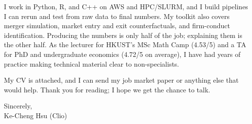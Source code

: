 \documentclass[11pt,letterpaper]{article}
\begin{document}
I work in Python, R, and C++ on AWS and HPC/SLURM, and I build pipelines I can rerun and test from raw data to final numbers. My toolkit also covers merger simulation, market entry and exit counterfactuals, and firm-conduct identification. Producing the numbers is only half of the job; explaining them is the other half. As the lecturer for HKUST's MSc Math Camp (4.53/5) and a TA for PhD and undergraduate economics (4.72/5 on average), I have had years of practice making technical material clear to non-specialists.

My CV is attached, and I can send my job market paper or anything else that would help. Thank you for reading; I hope we get the chance to talk.

\vspace{0.7em}
Sincerely,\\[1.0em]
Ke-Cheng Hsu (Clio)
\end{document}
